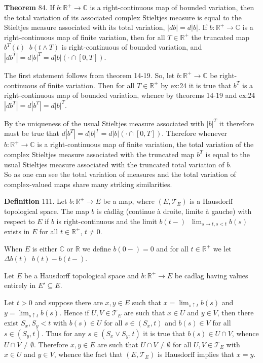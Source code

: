\documentclass[a4paper]{article}
\newcommand{\clo}[1]{\left [ #1 \right ]}
\newcommand{\brac}[1]{\left ( #1 \right )}
\newcommand{\abs}[1]{\left | #1 \right |}
\newcommand{\Real}{\mathbb{R}}
\newcommand{\Cplx}{\mathbb{C}}
\newcommand{\Tcal}{\mathcal{T}}
\newcommand{\defn}{\mathop{\overset{\Delta}{=}}\nolimits}
\begin{document}
\label{thm:trunc_cplx_siteltjes_tot_var}\noindent\textbf{Theorem} 84.
If $b:\Real^+\to\Cplx$ is a right-continuous map of bounded variation, then the total variation of its associated complex Stieltjes measure is equal to the Stieltjes measure associated with its total variation, $\abs{db}=d\abs{b}$. If $b:\Real^+\to\Cplx$ is a right-continuous map of finite variation, then for all $T\in \Real^+$ the truncated map $b^T\brac{t}\defn b\brac{t\wedge T}$ is right-continuous of bounded variation, and $\abs{db^T} = d\abs{b}^T = d\abs{b}\brac{\cdot \cap \clo{0,T}}$.

The first statement follows from theorem 14-19. So, let $b:\Real^+\to\Cplx$ be right-continuous of finite variation. Then for all $T\in \Real^+$ by ex:24 it is true that $b^T$ is a right-continuous map of bounded variation, whence by theorems 14-19 and ex:24 $\abs{db^T} = d\abs{b^T} = d\abs{b}^T$.

By the uniqueness of the usual Stieltjes measure associated with $\abs{b}^T$ it therefore must be true that $d\abs{b^T} = d\abs{b}^T = d\abs{b}\brac{\cdot\cap \clo{0,T}}$. Therefore whenever $b:\Real^+\to\Cplx$ is a right-continuous map of finite variation, the total variation of the complex Stieltjes measure associated with the truncated map $b^T$ is equal to the usual Stieltjes measure associated with the truncated total variation of $b$.\\

So as one can see the total variation of measures and the total variation of complex-valued maps share many striking similarities.

\noindent\textbf{Definition} 111.
Let $b:\Real^+\to E$ be a map, where $\brac{E, \Tcal_E}$ is a Hausdorff topological space. The map $b$ is c\`adl\`ag (continue \`a droite, limite \`a gauche) with respect to $E$ if $b$ is right-continuous and the limit $b\brac{t-}\defn \lim_{s\to t, s<t} b\brac{s}$ exists in $E$ for all $t\in \Real^+$, $t\neq 0$.

When $E$ is either $\Cplx$ or $\Real$ we define $b\brac{0-}=0$ and for all $t\in \Real^+$ we let $\Delta b\brac{t}\defn b\brac{t}-b\brac{t-}$.

\label{thm:cadlag_properties}
Let $E$ be a Hausdorff topological space and $b:\Real^+\to E$ be cadlag having values entirely in $E'\subseteq E$.

Let $t>0$ and suppose there are $x,y\in E$ such that $x=\lim_{s\uparrow t} b\brac{s}$ and $y=\lim_{s\uparrow t} b\brac{s}$. Hence if $U,V\in\Tcal_E$ are such that $x\in U$ and $y\in V$, then there exist $S_x,S_y<t$ with $b\brac{s}\in U$ for all $s\in \brac{S_x,t}$ and $b\brac{s}\in V$ for all $s\in \brac{S_y,t}$. Thus for any $s\in \brac{S_x\vee S_y, t}$ it is true that $b\brac{s}\in U\cap V$, whence $U\cap V\neq \emptyset$. Therefore $x,y\in E$ are such that $U\cap V\neq \emptyset$ for all $U,V\in\Tcal_E$ with $x\in U$ and $y\in V$, whence the fact that $\brac{E,\Tcal_E}$ is Hausdorff implies that $x=y$.
\end{document}
